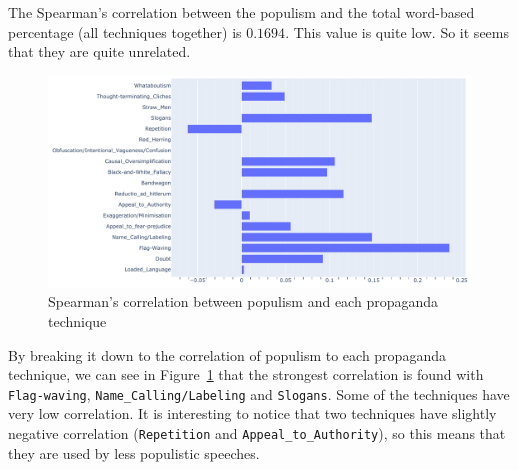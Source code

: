 

The Spearman's correlation between the populism and the total word-based percentage (all techniques together) is $0.1694$. This value is quite low. So it seems that they are quite unrelated. %

\begin{figure}[!htbp]
    \centering
    \includegraphics[width=\linewidth]{figures/populism_propaganda_correlation.pdf}
    \caption{Spearman's correlation between populism and each propaganda technique}
    \label{fig:populism_propaganda_correlation}
\end{figure}

By breaking it down to the correlation of populism to each propaganda technique, we can see in Figure~\ref{fig:populism_propaganda_correlation} that the strongest correlation is found with \texttt{Flag-waving}, \texttt{Name\_Calling/Labeling} and \texttt{Slogans}. Some of the techniques have very low correlation. It is interesting to notice that two techniques have slightly negative correlation (\texttt{Repetition} and \texttt{Appeal\_to\_Authority}), so this means that they are used by less populistic speeches.



